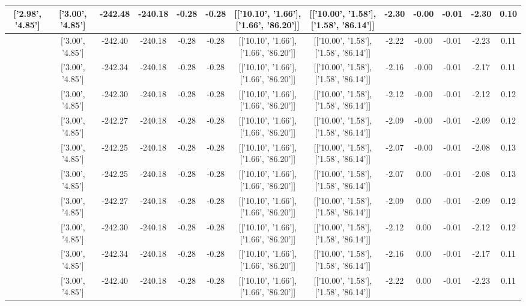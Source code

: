 \begin{table}[htbp]
\begin{adjustbox}{angle=90}
\begin{tabular}{|c|c|c|c|c|c|c|c|c|c|c|c|c|}
 ['2.98', '4.85'] & ['3.00', '4.85'] & -242.48 & -240.18 & -0.28 & -0.28 & [['10.10', '1.66'], ['1.66', '86.20']] & [['10.00', '1.58'], ['1.58', '86.14']] & -2.30 & -0.00 & -0.01 & -2.30 & 0.10\\ \hline
 ['2.98', '4.85'] & ['3.00', '4.85'] & -242.40 & -240.18 & -0.28 & -0.28 & [['10.10', '1.66'], ['1.66', '86.20']] & [['10.00', '1.58'], ['1.58', '86.14']] & -2.22 & -0.00 & -0.01 & -2.23 & 0.11\\ \hline
 ['2.99', '4.85'] & ['3.00', '4.85'] & -242.34 & -240.18 & -0.28 & -0.28 & [['10.10', '1.66'], ['1.66', '86.20']] & [['10.00', '1.58'], ['1.58', '86.14']] & -2.16 & -0.00 & -0.01 & -2.17 & 0.11\\ \hline
 ['2.99', '4.85'] & ['3.00', '4.85'] & -242.30 & -240.18 & -0.28 & -0.28 & [['10.10', '1.66'], ['1.66', '86.20']] & [['10.00', '1.58'], ['1.58', '86.14']] & -2.12 & -0.00 & -0.01 & -2.12 & 0.12\\ \hline
 ['2.99', '4.85'] & ['3.00', '4.85'] & -242.27 & -240.18 & -0.28 & -0.28 & [['10.10', '1.66'], ['1.66', '86.20']] & [['10.00', '1.58'], ['1.58', '86.14']] & -2.09 & -0.00 & -0.01 & -2.09 & 0.12\\ \hline
 ['3.00', '4.85'] & ['3.00', '4.85'] & -242.25 & -240.18 & -0.28 & -0.28 & [['10.10', '1.66'], ['1.66', '86.20']] & [['10.00', '1.58'], ['1.58', '86.14']] & -2.07 & -0.00 & -0.01 & -2.08 & 0.13\\ \hline
 ['3.00', '4.85'] & ['3.00', '4.85'] & -242.25 & -240.18 & -0.28 & -0.28 & [['10.10', '1.66'], ['1.66', '86.20']] & [['10.00', '1.58'], ['1.58', '86.14']] & -2.07 & 0.00 & -0.01 & -2.08 & 0.13\\ \hline
 ['3.01', '4.85'] & ['3.00', '4.85'] & -242.27 & -240.18 & -0.28 & -0.28 & [['10.10', '1.66'], ['1.66', '86.20']] & [['10.00', '1.58'], ['1.58', '86.14']] & -2.09 & 0.00 & -0.01 & -2.09 & 0.12\\ \hline
 ['3.01', '4.85'] & ['3.00', '4.85'] & -242.30 & -240.18 & -0.28 & -0.28 & [['10.10', '1.66'], ['1.66', '86.20']] & [['10.00', '1.58'], ['1.58', '86.14']] & -2.12 & 0.00 & -0.01 & -2.12 & 0.12\\ \hline
 ['3.01', '4.85'] & ['3.00', '4.85'] & -242.34 & -240.18 & -0.28 & -0.28 & [['10.10', '1.66'], ['1.66', '86.20']] & [['10.00', '1.58'], ['1.58', '86.14']] & -2.16 & 0.00 & -0.01 & -2.17 & 0.11\\ \hline
 ['3.02', '4.86'] & ['3.00', '4.85'] & -242.40 & -240.18 & -0.28 & -0.28 & [['10.10', '1.66'], ['1.66', '86.20']] & [['10.00', '1.58'], ['1.58', '86.14']] & -2.22 & 0.00 & -0.01 & -2.23 & 0.11\\ \hline

\end{tabular}
\end{adjustbox}
\end{table}
